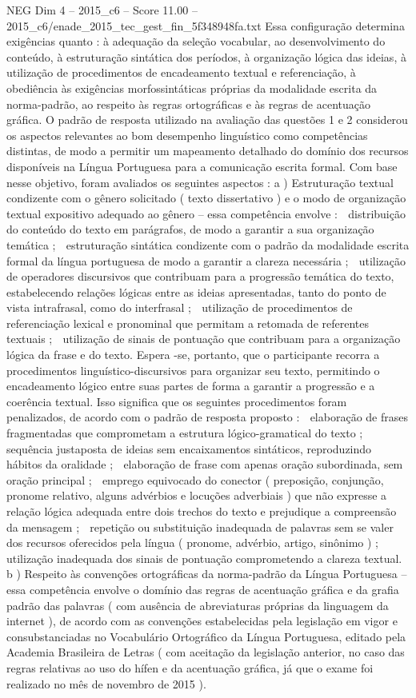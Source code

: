 \begin{textsample}{NEG Dim 4 – 2015\_c6 – Score 11.00 – 2015\_c6/enade\_2015\_tec\_gest\_fin\_5f348948fa.txt}
Essa configuração determina exigências quanto : à adequação da seleção vocabular, ao desenvolvimento do conteúdo, à estruturação sintática dos períodos, à organização lógica das ideias, à utilização de procedimentos de encadeamento textual e referenciação, à obediência às exigências morfossintáticas próprias da modalidade escrita da norma-padrão, ao respeito às regras ortográficas e às regras de acentuação gráfica.
O padrão de resposta utilizado na avaliação das questões 1 e 2 considerou os aspectos relevantes ao bom desempenho linguístico como competências distintas, de modo a permitir um mapeamento detalhado do domínio dos recursos disponíveis na Língua Portuguesa para a comunicação escrita formal.
Com base nesse objetivo, foram avaliados os seguintes aspectos : a ) Estruturação textual condizente com o gênero solicitado ( texto dissertativo ) e o modo de organização textual expositivo adequado ao gênero – essa competência envolve :  distribuição do conteúdo do texto em parágrafos, de modo a garantir a sua organização temática ;  estruturação sintática condizente com o padrão da modalidade escrita formal da língua portuguesa de modo a garantir a clareza necessária ;  utilização de operadores discursivos que contribuam para a progressão temática do texto, estabelecendo relações lógicas entre as ideias apresentadas, tanto do ponto de vista intrafrasal, como do interfrasal ;  utilização de procedimentos de referenciação lexical e pronominal que permitam a retomada de referentes textuais ;  utilização de sinais de pontuação que contribuam para a organização lógica da frase e do texto.
Espera -se, portanto, que o participante recorra a procedimentos linguístico-discursivos para organizar seu texto, permitindo o encadeamento lógico entre suas partes de forma a garantir a progressão e a coerência textual.
Isso significa que os seguintes procedimentos foram penalizados, de acordo com o padrão de resposta proposto :  elaboração de frases fragmentadas que comprometam a estrutura lógico-gramatical do texto ;  sequência justaposta de ideias sem encaixamentos sintáticos, reproduzindo hábitos da oralidade ;  elaboração de frase com apenas oração subordinada, sem oração principal ;  emprego equivocado do conector ( preposição, conjunção, pronome relativo, alguns advérbios e locuções adverbiais ) que não expresse a relação lógica adequada entre dois trechos do texto e prejudique a compreensão da mensagem ;  repetição ou substituição inadequada de palavras sem se valer dos recursos oferecidos pela língua ( pronome, advérbio, artigo, sinônimo ) ;  utilização inadequada dos sinais de pontuação comprometendo a clareza textual. b ) Respeito às convenções ortográficas da norma-padrão da Língua Portuguesa – essa competência envolve o domínio das regras de acentuação gráfica e da grafia padrão das palavras ( com ausência de abreviaturas próprias da linguagem da internet ), de acordo com as convenções estabelecidas pela legislação em vigor e consubstanciadas no Vocabulário Ortográfico da Língua Portuguesa, editado pela Academia Brasileira de Letras ( com aceitação da legislação anterior, no caso das regras relativas ao uso do hífen e da acentuação gráfica, já que o exame foi realizado no mês de novembro de 2015 ).

\end{textsample}
